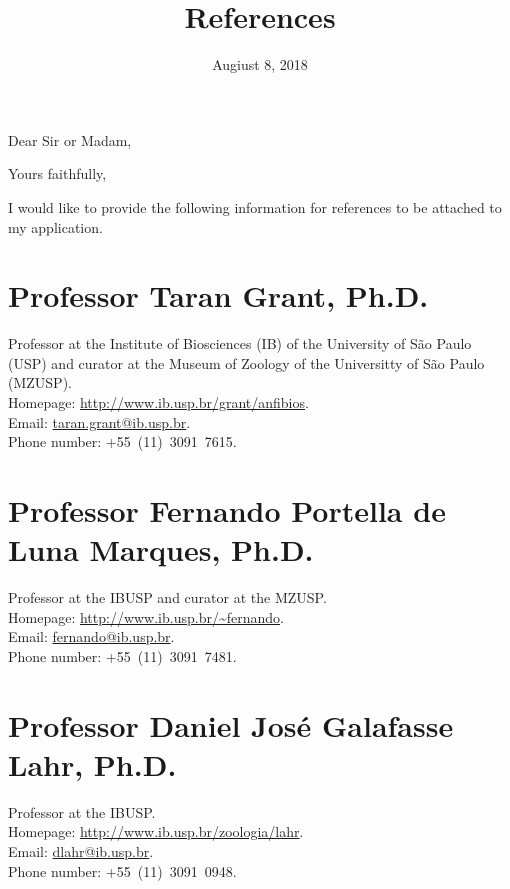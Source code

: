 \documentclass[12pt, a4paper, roman, twoside]{moderncv}        %
\title{References}                               %
\begin{document}
\thispagestyle{empty} %
%
\date{Augiust 8, 2018}
\opening{Dear Sir or Madam,}
\closing{Yours faithfully,}
\makelettertitle
%
I would like to provide the following information for references to be attached to my application.
%
\section{Professor Taran Grant, Ph.D.}
    {\begin{changemargin}{0.5cm}{0.5cm}{\small
    Professor at the Institute of Biosciences (IB) of the University of São Paulo (USP) and curator at the Museum of Zoology of the Universitty of São Paulo (MZUSP).\\
    Homepage: \url{http://www.ib.usp.br/grant/anfibios}.\\
    Email: \href{mailto:taran.grant@ib.usp.br}{taran.grant@ib.usp.br}.\\
    Phone number: +55~(11)~3091~7615.\\
    }\end{changemargin}}
%
\section{Professor Fernando Portella de Luna Marques, Ph.D.}
    {\begin{changemargin}{0.5cm}{0.5cm}{\small
    Professor at the IBUSP and curator at the MZUSP.\\
    Homepage: \url{http://www.ib.usp.br/~fernando}.\\
    Email: \href{mailto:fernando@ib.usp.br}{fernando@ib.usp.br}.\\
    Phone number: +55~(11)~3091~7481.\\
    }\end{changemargin}}
%
\section{Professor Daniel José Galafasse Lahr, Ph.D.}
    {\begin{changemargin}{0.5cm}{0.5cm}{\small
    Professor at the IBUSP.\\
    Homepage: \url{http://www.ib.usp.br/zoologia/lahr}.\\
    Email: \href{mailto:dlahr@ib.usp.br}{dlahr@ib.usp.br}.\\
    Phone number: +55~(11)~3091~0948.\\
    }\end{changemargin}}
%
\end{document}
